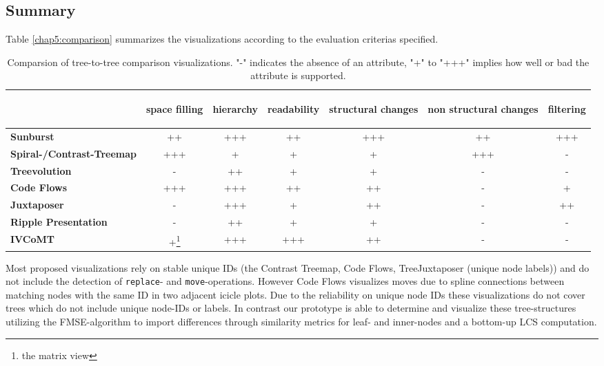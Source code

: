 \subsection{Summary}
Table \ref{chap5:comparison} summarizes the visualizations according to the evaluation criterias specified.

\begin{table}[tb]
\centering 
\begin{tabular}[r]{|l|c|c|c|c|c|c|} 
\hline
& \begin{sideways}\textbf{space filling}\end{sideways} & \begin{sideways}\textbf{hierarchy}\end{sideways} & \begin{sideways}\textbf{readability}\end{sideways} & \begin{sideways}\textbf{structural changes}\end{sideways} & \begin{sideways}\textbf{non structural changes}\end{sideways} & \begin{sideways}\textbf{filtering}\end{sideways}\\
\hline
\hline
\textbf{Sunburst} & ++ & +++ & ++ & +++ & ++ & +++\\
\hline
\textbf{Spiral-/Contrast-Treemap} & +++ & + & + & + & +++ & -\\
\hline
\textbf{Treevolution} & - & ++ & + & + & - & -\\
\hline
\textbf{Code Flows} & +++ & +++ & ++ & ++ & - & +\\
\hline
\textbf{Juxtaposer} & - & +++ & + & ++ & - & ++ \\
\hline
\textbf{Ripple Presentation} & - & ++ & + & + & - & -\\
\hline
\textbf{IVCoMT} & +\footnote{the matrix view} & +++ & +++ & ++ & - & - \\
\hline
\end{tabular}
\label{chap5:comparsion}
\vspace{0.5em} 
\caption{Comparsion of tree-to-tree comparison visualizations. "-" indicates the absence of an attribute, "+" to "+++" implies how well or bad the attribute is supported.}
\end{table}

Most proposed visualizations rely on stable unique IDs (the Contrast Treemap\cite{tu2007visualizing}, Code Flows\cite{telea2008code}, TreeJuxtaposer\cite{munzner2003treejuxtaposer} (unique node labels)) and do not include the detection of \texttt{replace}- and \texttt{move}-operations. However Code Flows visualizes moves due to spline connections between matching nodes with the same ID in two adjacent icicle plots. Due to the reliability on unique node IDs these visualizations do not cover trees which do not include unique node-IDs or labels. In contrast our prototype is able to determine and visualize these tree-structures utilizing the FMSE-algorithm to import differences through similarity metrics for leaf- and inner-nodes and a bottom-up LCS computation.


